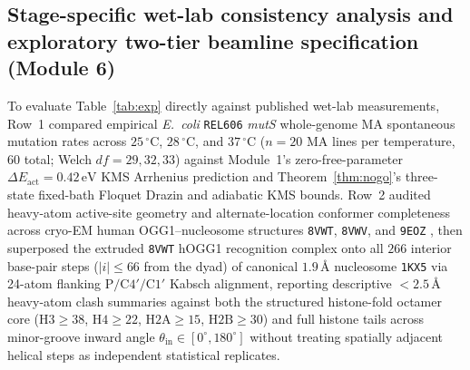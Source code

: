 \documentclass[10pt,letterpaper]{article}
\theoremstyle{plain}
\theoremstyle{definition}
\begin{document}
\subsection*{Stage-specific wet-lab consistency analysis and exploratory two-tier beamline specification (Module 6)}

To evaluate Table~\ref{tab:exp} directly against published wet-lab measurements, Row~1 compared empirical \emph{E.\ coli} \texttt{REL606} \emph{mutS} whole-genome MA spontaneous mutation rates across $25\,^\circ\mathrm{C}$, $28\,^\circ\mathrm{C}$, and $37\,^\circ\mathrm{C}$ ($n=20$ MA lines per temperature, $60$ total; Welch $df = 29, 32, 33$) \cite{chu2018bmcevol} against Module~1's zero-free-parameter $\Delta E_{\mathrm{act}} = 0.42\,\mathrm{eV}$ KMS Arrhenius prediction and Theorem~\ref{thm:nogo}'s three-state fixed-bath Floquet Drazin and adiabatic KMS bounds. Row~2 audited heavy-atom active-site geometry and alternate-location conformer completeness across cryo-EM human OGG1--nucleosome structures \texttt{8VWT}, \texttt{8VWV}, and \texttt{9EOZ} \cite{ren2024natcommun}, then superposed the extruded \texttt{8VWT} hOGG1 recognition complex onto all $266$ interior base-pair steps ($|i| \le 66$ from the dyad) of canonical $1.9\,\text{\AA}$ nucleosome \texttt{1KX5} via 24-atom flanking $\mathrm{P/C4'/C1'}$ Kabsch alignment, reporting descriptive $<2.5\,\text{\AA}$ heavy-atom clash summaries against both the structured histone-fold octamer core ($\mathrm{H3}\ge 38$, $\mathrm{H4}\ge 22$, $\mathrm{H2A}\ge 15$, $\mathrm{H2B}\ge 30$) and full histone tails across minor-groove inward angle $\theta_{\mathrm{in}} \in [0^\circ, 180^\circ]$ without treating spatially adjacent helical steps as independent statistical replicates.
\end{document}
